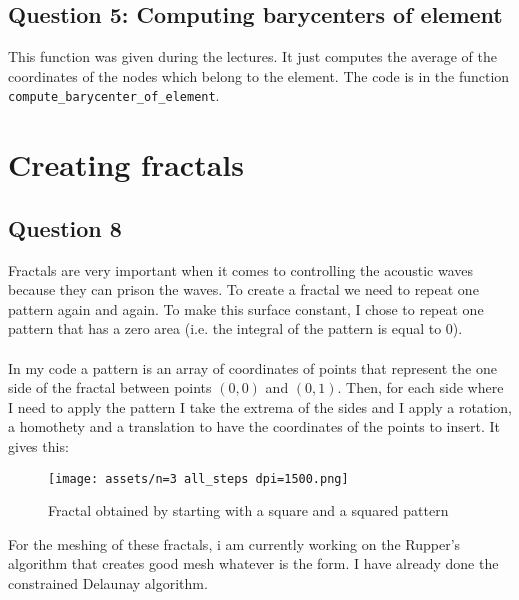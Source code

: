 \documentclass[a4paper]{article}
\begin{document}
\subsection{Question 5: Computing barycenters of element}

This function was given during the lectures. It just computes the average of the coordinates of the nodes which belong to the element. The code is in the function \texttt{compute\_barycenter\_of\_element}.

\section{Creating fractals}

\subsection{Question 8}

Fractals are very important when it comes to controlling the acoustic waves because they can prison the waves. To create a fractal we need to repeat one pattern again and again. To make this surface constant, I chose to repeat one pattern that has a zero area (i.e. the integral of the pattern is equal to $0$).\\ \\
In my code a pattern is an array of coordinates of points that represent the one side of the fractal between points $(0, 0)$ and $(0,1)$. Then, for each side where I need to apply the pattern I take the extrema of the sides and I apply a rotation, a homothety and a translation to have the coordinates of the points to insert. It gives this:
\begin{figure}[H]
    \centering
    \texttt{[image: assets/n=3 all\_steps dpi=1500.png]}
    \caption{Fractal obtained by starting with a square and a squared pattern}
    \label{fig:plot_classic_example}
\end{figure}
\noindent For the meshing of these fractals, i am currently working on the Rupper's algorithm that creates good mesh whatever is the form. I have already done the constrained Delaunay algorithm.
\end{document}
